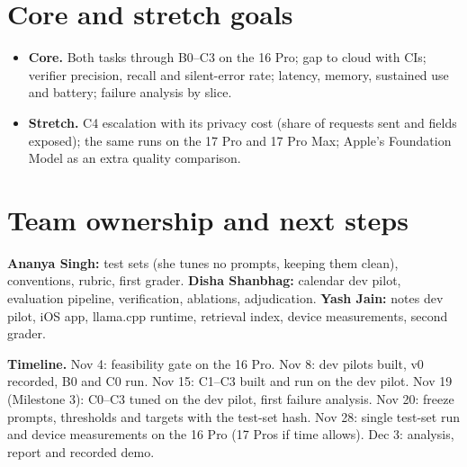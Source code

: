 \documentclass[10pt,letterpaper]{article}
\begin{document}
\section{Core and stretch goals}
\begin{itemize}
  \item \textbf{Core.} Both tasks through B0--C3 on the 16 Pro; gap to cloud with CIs; verifier precision, recall and silent-error rate; latency, memory, sustained use and battery; failure analysis by slice.
  \item \textbf{Stretch.} C4 escalation with its privacy cost (share of requests sent and fields exposed); the same runs on the 17 Pro and 17 Pro Max; Apple's Foundation Model as an extra quality comparison.
\end{itemize}

\section{Team ownership and next steps}
\textbf{Ananya Singh:} test sets (she tunes no prompts, keeping them clean), conventions, rubric, first grader.
\textbf{Disha Shanbhag:} calendar dev pilot, evaluation pipeline, verification, ablations, adjudication.
\textbf{Yash Jain:} notes dev pilot, iOS app, llama.cpp runtime, retrieval index, device measurements, second grader.

\textbf{Timeline.} Nov 4: feasibility gate on the 16 Pro. Nov 8: dev pilots built, v0 recorded, B0 and C0 run. Nov 15: C1--C3 built and run on the dev pilot. Nov 19 (Milestone 3): C0--C3 tuned on the dev pilot, first failure analysis. Nov 20: freeze prompts, thresholds and targets with the test-set hash. Nov 28: single test-set run and device measurements on the 16 Pro (17 Pros if time allows). Dec 3: analysis, report and recorded demo.
\end{document}
